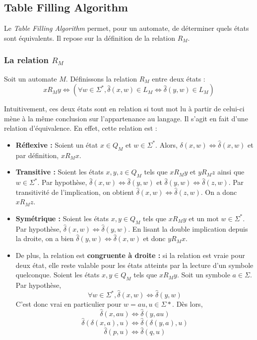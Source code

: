 \subsection{Table Filling Algorithm}\label{ss:tfa}

Le \emph{Table Filling Algorithm} permet, pour un automate, de déterminer quels états sont équivalents. Il repose sur la définition de la relation $R_M$.

\subsubsection{La relation $R_M$}

Soit un automate $M$. Définissons la relation $R_M$ entre deux états : $$xR_My \iff (\forall w \in \Sigma^*, \hat{\delta}(x,w) \in L_M \iff \hat{\delta}(y,w) \in L_M)$$

Intuitivement, ces deux états sont en relation si tout mot lu à partir de celui-ci mène à la même conclusion sur l'appartenance au langage. Il s'agit en fait d'une relation d'équivalence. En effet, cette relation est :

\begin{itemize}
	\item \textbf{Réflexive :} Soient un état $x \in Q_M$ et $w \in \Sigma^*$. Alors, $\delta(x,w) \iff \hat{\delta}(x,w)$ et par définition, $xR_Mx$.
	\item \textbf{Transitive :} Soient les états $x,y,z \in Q_M$ tels que $xR_My$ et $yR_Mz$ ainsi que $w \in \Sigma^*$. Par hypothèse, $\hat{\delta}(x,w) \iff \hat{\delta}(y,w)$ et $\hat{\delta}(y,w) \iff \hat{\delta}(z,w)$. Par transitivité de l'implication, on obtient $\hat{\delta}(x,w) \iff \hat{\delta}(z,w)$. On a donc $xR_Mz$.
	\item \textbf{Symétrique : } Soient les états $x,y \in Q_M$ tels que $xR_My$ et un mot $w \in \Sigma^*$. Par hypothèse, $\hat{\delta}(x, w) \iff \hat{\delta}(y, w)$. En lisant la double implication depuis la droite, on a bien $\hat{\delta}(y, w) \iff \hat{\delta}(x, w)$ et donc $yR_Mx$.
	\item De plus, la relation est \textbf{congruente à droite :} si la relation est vraie pour deux état, elle reste valable pour les états atteints par la lecture d'un symbole quelconque. Soient les états $x,y \in Q_M$ tels que $xR_My$. Soit un symbole $a \in \Sigma$. Par hypothèse, $$\forall w \in \Sigma^*, \hat{\delta}(x, w) \iff \hat{\delta}(y, w)$$
	C'est donc vrai en particulier pour $w = au, u \in \Sigma*$. Dès lors,
	$$\hat{\delta}(x, au) \iff \hat{\delta}(y, au)$$
	$$\hat{\delta}(\delta(x,a),u) \iff\hat{\delta}(\delta(y,a),u)$$
	$$\hat{\delta}(p,u) \iff \hat{\delta}(q,u)$$
\end{itemize}

